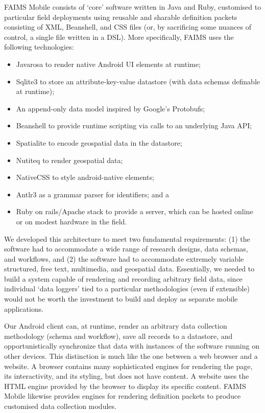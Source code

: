 \documentclass[preprint,12pt, a4paper]{elsarticle}
\begin{document}
FAIMS Mobile consists of `core' software written in Java and Ruby, customised to particular field deployments using reusable and sharable definition packets consisting of XML, Beanshell, and CSS files (or, by sacrificing some nuances of control, a single file written in a DSL). More specifically, FAIMS uses the following technologies:

\begin{itemize}
\item Javarosa to render native Android UI elements at runtime;
\item Sqlite3 to store an attribute-key-value datastore (with data schemas definable at runtime);
\item An append-only data model inspired by Google's Protobufs;
\item Beanshell to provide runtime scripting via calls to an underlying Java API;
\item Spatialite to encode geospatial data in the datastore;
\item Nutiteq to render geospatial data;
\item NativeCSS to style android-native elements;
\item Antlr3 as a grammar parser for identifiers; and a
\item Ruby on rails/Apache stack to provide a server, which can be hosted online or on modest hardware in the field.
\end{itemize}

We developed this architecture to meet two fundamental requirements: (1) the software had to accommodate a wide range of research designs, data schemas, and workflows, and (2) the software had to accommodate extremely variable structured, free text, multimedia, and geospatial data. Essentially, we needed to build a system capable of rendering and recording arbitrary field data, since individual `data loggers' tied to a particular methodologies (even if extensible) would not be worth the investment to build and deploy as separate mobile applications. 

Our Android client can, at runtime, render an arbitrary data collection methodology (schema and workflow), save all records to a datastore, and opportunistically synchronize that data with instances of the software running on other devices. This distinction is much like the one between a web browser and a website. A browser contains many sophisticated engines for rendering the page, its interactivity, and its styling, but does not have content. A website uses the HTML engine provided by the browser to display its specific content. FAIMS Mobile likewise provides engines for rendering definition packets to produce customised data collection modules. 
\end{document}
